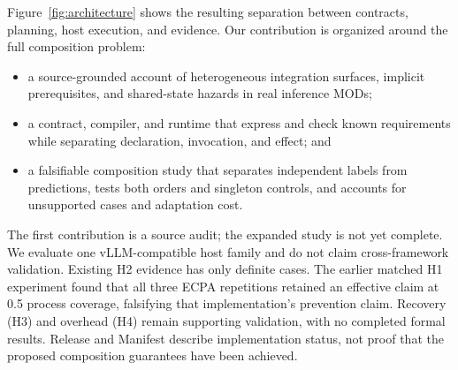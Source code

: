 \documentclass[letterpaper,twocolumn,10pt]{article}
\begin{document}
Figure~\ref{fig:architecture} shows the resulting separation between
contracts, planning, host execution, and evidence. Our contribution is
organized around the full composition problem:
\begin{itemize}
  \item a source-grounded account of heterogeneous integration surfaces,
  implicit prerequisites, and shared-state hazards in real inference MODs;
  \item a contract, compiler, and runtime that express and check known
  requirements while separating declaration, invocation, and effect; and
  \item a falsifiable composition study that separates independent labels
  from predictions, tests both orders and singleton controls, and accounts
  for unsupported cases and adaptation cost.
\end{itemize}
The first contribution is a source audit; the expanded study is not yet
complete. We evaluate one vLLM-compatible host family and do not claim
cross-framework validation. Existing H2 evidence has only
\ECPAHTwoScoredCases{} definite cases. The earlier matched H1 experiment
found that all three ECPA repetitions retained an effective claim at 0.5
process coverage, falsifying that implementation's prevention claim.
Recovery (H3) and overhead (H4) remain supporting validation, with no completed
formal results. Release \ECPAReleaseVersion{} and Manifest
\ECPAManifestVersion{} describe implementation status, not proof that the
proposed composition guarantees have been achieved.
\end{document}

